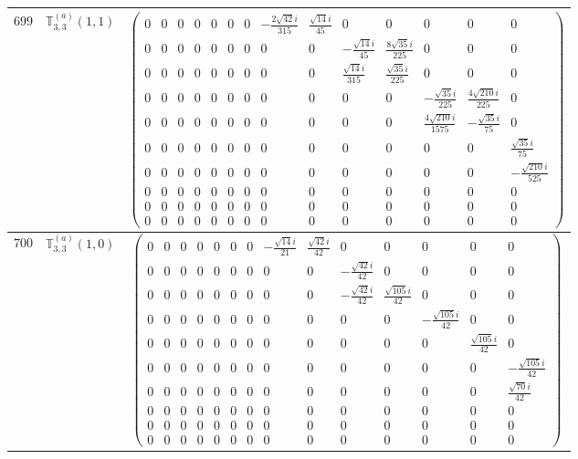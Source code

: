 \documentclass[fleqn,8pt,landscape]{jsarticle}
\begin{document}
\begin{center}
\begin{longtable}{ccc}
$ 699 $ & $ \mathbb{T}_{3,3}^{(a)}(1,1) $ & $ \begin{pmatrix} 0 & 0 & 0 & 0 & 0 & 0 & 0 & - \frac{2 \sqrt{42} i}{315} & \frac{\sqrt{14} i}{45} & 0 & 0 & 0 & 0 & 0 \\ 0 & 0 & 0 & 0 & 0 & 0 & 0 & 0 & 0 & - \frac{\sqrt{14} i}{45} & \frac{8 \sqrt{35} i}{225} & 0 & 0 & 0 \\ 0 & 0 & 0 & 0 & 0 & 0 & 0 & 0 & 0 & \frac{\sqrt{14} i}{315} & \frac{\sqrt{35} i}{225} & 0 & 0 & 0 \\ 0 & 0 & 0 & 0 & 0 & 0 & 0 & 0 & 0 & 0 & 0 & - \frac{\sqrt{35} i}{225} & \frac{4 \sqrt{210} i}{225} & 0 \\ 0 & 0 & 0 & 0 & 0 & 0 & 0 & 0 & 0 & 0 & 0 & \frac{4 \sqrt{210} i}{1575} & - \frac{\sqrt{35} i}{75} & 0 \\ 0 & 0 & 0 & 0 & 0 & 0 & 0 & 0 & 0 & 0 & 0 & 0 & 0 & \frac{\sqrt{35} i}{75} \\ 0 & 0 & 0 & 0 & 0 & 0 & 0 & 0 & 0 & 0 & 0 & 0 & 0 & - \frac{\sqrt{210} i}{525} \\ 0 & 0 & 0 & 0 & 0 & 0 & 0 & 0 & 0 & 0 & 0 & 0 & 0 & 0 \\ 0 & 0 & 0 & 0 & 0 & 0 & 0 & 0 & 0 & 0 & 0 & 0 & 0 & 0 \\ 0 & 0 & 0 & 0 & 0 & 0 & 0 & 0 & 0 & 0 & 0 & 0 & 0 & 0 \end{pmatrix} $ \\ \hline
$ 700 $ & $ \mathbb{T}_{3,3}^{(a)}(1,0) $ & $ \begin{pmatrix} 0 & 0 & 0 & 0 & 0 & 0 & 0 & - \frac{\sqrt{14} i}{21} & \frac{\sqrt{42} i}{42} & 0 & 0 & 0 & 0 & 0 \\ 0 & 0 & 0 & 0 & 0 & 0 & 0 & 0 & 0 & - \frac{\sqrt{42} i}{42} & 0 & 0 & 0 & 0 \\ 0 & 0 & 0 & 0 & 0 & 0 & 0 & 0 & 0 & - \frac{\sqrt{42} i}{42} & \frac{\sqrt{105} i}{42} & 0 & 0 & 0 \\ 0 & 0 & 0 & 0 & 0 & 0 & 0 & 0 & 0 & 0 & 0 & - \frac{\sqrt{105} i}{42} & 0 & 0 \\ 0 & 0 & 0 & 0 & 0 & 0 & 0 & 0 & 0 & 0 & 0 & 0 & \frac{\sqrt{105} i}{42} & 0 \\ 0 & 0 & 0 & 0 & 0 & 0 & 0 & 0 & 0 & 0 & 0 & 0 & 0 & - \frac{\sqrt{105} i}{42} \\ 0 & 0 & 0 & 0 & 0 & 0 & 0 & 0 & 0 & 0 & 0 & 0 & 0 & \frac{\sqrt{70} i}{42} \\ 0 & 0 & 0 & 0 & 0 & 0 & 0 & 0 & 0 & 0 & 0 & 0 & 0 & 0 \\ 0 & 0 & 0 & 0 & 0 & 0 & 0 & 0 & 0 & 0 & 0 & 0 & 0 & 0 \\ 0 & 0 & 0 & 0 & 0 & 0 & 0 & 0 & 0 & 0 & 0 & 0 & 0 & 0 \end{pmatrix} $ \\ \hline

\end{longtable}
\end{center}
\end{document}
